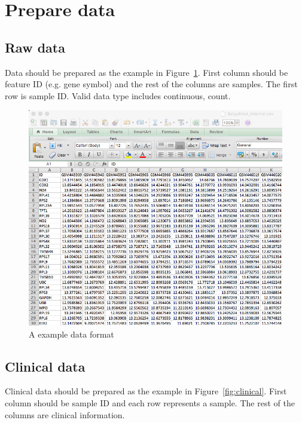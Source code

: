 
\section{Prepare data}
\label{sec:dataPrepare}
\subsection{Raw data}

Data should be prepared as the example in Figure~\ref{fig:dataMicroarray}.
First column should be feature ID (e.g. gene symbol) and the rest of the columns are samples.
The first row is sample ID.
Valid data type includes continuous, count.

\begin{figure}[H]
\begin{center}
\includegraphics[scale=0.5]{./figure/dataMicroarray}
\caption{A example data format}
\label{fig:dataMicroarray}
\end{center}
\end{figure}

\subsection{Clinical data}

Clinical data should be prepared as the example in Figure~\ref{fig:clinical}.
First column should be sample ID and each row represents a sample.
The rest of the columns are clinical information.

